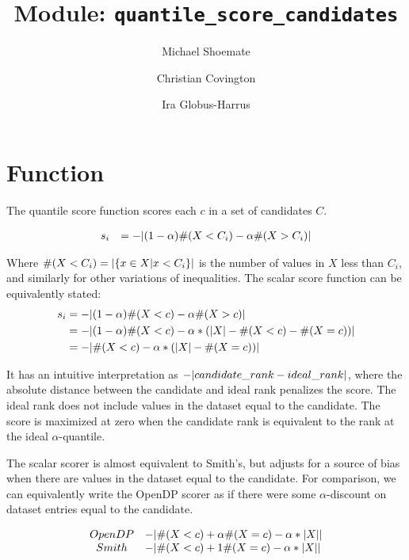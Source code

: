 

% 


\title{Module: \texttt{quantile\_score\_candidates}}
\author{Michael Shoemate \and Christian Covington \and Ira Globus-Harrus}

\maketitle

\section{Function}
The quantile score function scores each $c$ in a set of candidates $C$.

\begin{equation}
\begin{array}{rl}
    s_i &= -\lvert(1 - \alpha) \#(X < C_i) - \alpha \#(X > C_i)\rvert
\end{array}
\end{equation}

Where $\#(X < C_i) = \lvert\{x \in X | x < C_i\}\rvert$ is the number of values in $X$ less than $C_i$, 
and similarly for other variations of inequalities.
The scalar score function can be equivalently stated:
\begin{align}
    s_i &= -\lvert(1 - \alpha) \#(X < c) - \alpha \#(X > c)\rvert \\
    &= -\lvert(1 - \alpha) \#(X < c) - \alpha * (\lvert X\rvert - \#(X < c) - \#(X = c))\rvert \\
    &= -\lvert\#(X < c) - \alpha * (\lvert X\rvert - \#(X = c))\rvert
\end{align}

It has an intuitive interpretation as $-\lvert candidate\_rank - ideal\_rank\rvert$, 
where the absolute distance between the candidate and ideal rank penalizes the score.
The ideal rank does not include values in the dataset equal to the candidate.
The score is maximized at zero when the candidate rank is equivalent to the rank at the ideal $\alpha$-quantile.

The scalar scorer is almost equivalent to Smith's\cite{Smith11}, but adjusts for a source of bias when there are values in the dataset equal to the candidate.
For comparison, we can equivalently write the OpenDP scorer as if there were some $\alpha$-discount on dataset entries equal to the candidate.

\[
\begin{array}{cl}
    OpenDP &-\lvert\#(X < c) + \alpha \#(X = c) - \alpha * \lvert X\rvert\rvert \\
    Smith &-\lvert\#(X < c) + 1 \#(X = c) - \alpha * \lvert X\rvert\rvert
\end{array}
\]

